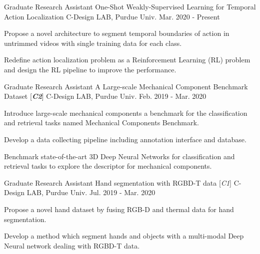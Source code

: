 

\begin{cventries}

\cventry
{Graduate Research Assistant} %
{One-Shot Weakly-Supervised Learning for Temporal Action Localization} %
{C-Design LAB, Purdue Univ.} %
{Mar. 2020 - Present} %
{ %
\begin{cvitems}
\item {Propose a novel architecture to segment temporal boundaries of action in untrimmed videos with single training data for each class.}
\item {Redefine action localization problem as a Reinforcement Learning (RL) problem and design the RL pipeline to improve the performance.}
\end{cvitems}
}

\cventry
{Graduate Research Assistant} %
{A Large-scale Mechanical Component Benchmark Dataset [\textit{\textbf{C2}}]} %
{C-Design LAB, Purdue Univ.} %
{Feb. 2019 - Mar. 2020} %
{ %
\begin{cvitems}
\item {Introduce large-scale mechanical components a benchmark for the classification and retrieval tasks named Mechanical Components Benchmark.}
\item {Develop a data collecting pipeline including annotation interface and database.}
\item {Benchmark state-of-the-art 3D Deep Neural Networks for classification and retrieval tasks to explore the descriptor for mechanical components.}
\end{cvitems}
}

\cventry
{Graduate Research Assistant} %
{Hand segmentation with RGBD-T data [\textit{\textit{C1}}]} %
{C-Design LAB, Purdue Univ.} %
{Jul. 2019 - Mar. 2020} %
{ %
\begin{cvitems}
\item {Propose a novel hand dataset by fusing RGB-D and thermal data for hand segmentation.}
\item {Develop a method which segment hands and objects with a multi-modal Deep Neural network dealing with RGBD-T data.}
\end{cvitems}
}


\end{cventries}
